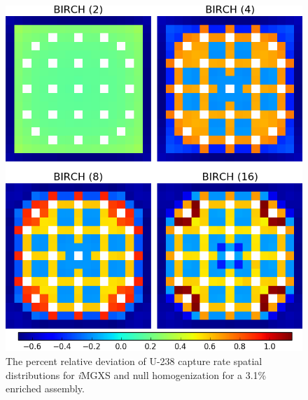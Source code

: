 \begin{figure}[h!]
\centering
\includegraphics[width=0.9\linewidth]{figures/results/compare/assm-31/compare-capt}
\vspace{2mm}
\caption[U-238 capture rate comparison for a 3.1\% enriched assembly]{The percent relative deviation of U-238 capture rate spatial distributions for \textit{i}\ac{MGXS} and null homogenization for a 3.1\% enriched assembly.}
\label{fig:chap11-assm-3.1-capt-rates-comp}
\end{figure}

\clearpage

